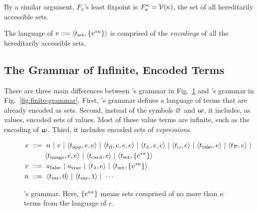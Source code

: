 \begin{example}
By a similar argument, $F_a$'s least fixpoint is $F_a^\kappa = \mathcal{V}(\kappa)$, the set of all hereditarily accessible sets.
\exampleqed
\end{example}

\begin{example}
The language of $v ::= \langle{t_\mathrm{set},\ensuremath{\{{{v}^{*{\kappa}}}\}}}\rangle$ is comprised of the \emph{encodings} of all the hereditarily accessible sets.
\exampleqed
\end{example}

\subsection{The Grammar of Infinite, Encoded Terms}

There are three main differences between \targetlang's grammar in Fig.~\ref{fig:grammar} and \ftargetlang's grammar in Fig.~\ref{fig:finite-grammar}. First, \targetlang's grammar defines a language of terms that are already encoded as sets. Second, instead of the symbols $\lemptyset$ and $\upomega$, it includes, as values, encoded sets of values. Most of these value terms are infinite, such as the encoding of $\upomega$. Third, it includes encoded sets of \emph{expressions}.

\begin{figure*}[tb]\centering
\begin{varwidth}[t]{\textwidth}
\begin{equation*}
\begin{aligned}
	e &\ ::=\ n \ |\  v \ |\  \langle{t_\mathrm{app},e,e}\rangle \ |\  \langle{t_\mathrm{if},e,e,e}\rangle \ |\  \langle{t_\in,e,e}\rangle \ |\ 
		\langle{t_\cup,e}\rangle \ |\  \langle{t_\mathrm{take},e}\rangle \ |\  \langle{t_{\mathcal{P}},e}\rangle \ |\  \\
		&\ \ \ \ \ \ \ \langle{t_\mathrm{image},e,e}\rangle \ |\  \langle{t_\mathrm{card},e}\rangle \ |\  \langle{t_\mathrm{set},\ensuremath{\{{{e}^{*{\kappa}}}\}}}\rangle \\
	v &\ ::=\ a_\mathrm{false} \ |\  a_\mathrm{true} \ |\  \langle{t_\lambda,e}\rangle \ |\  \langle{t_\mathrm{set},\ensuremath{\{{{v}^{*{\kappa}}}\}}}\rangle \\
	n &\ ::=\ \langle{t_\mathrm{var},0}\rangle \ |\  \langle{t_\mathrm{var},1}\rangle \ |\  \cdots
\end{aligned}
\end{equation*}
\end{varwidth}
\bottomhrule
\caption[\targetlang's grammar]{\targetlang's grammar. Here, $\{{{e}^{*{\kappa}}}\}$ means sets comprised of no more than $\kappa$ terms from the language of $e$.}
\label{fig:grammar}
\end{figure*}

